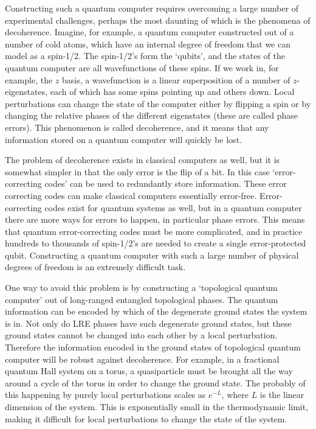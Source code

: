 Constructing such a quantum computer requires overcoming a large number of experimental challenges, perhaps the most daunting of which is the phenomena of decoherence. Imagine, for example, a quantum computer constructed out of a number of cold atoms, which have an internal degree of freedom that we can model as a spin-1/2. The spin-1/2's form the `qubits', and the states of the quantum computer are all wavefunctions of these spins. If we work in, for example, the $z$ basis, a wavefunction is a linear superposition of a number of $z$-eigenstates, each of which has some spins pointing up and others down. Local perturbations can change the state of the computer either by flipping a spin or by changing the relative phases of the different eigenstates (these are called phase errors). This phenomenon is called decoherence, and it means that any information stored on a quantum computer will quickly be lost.

The problem of decoherence exists in classical computers as well, but it is somewhat simpler in that the only error is the flip of a bit. In this case `error-correcting codes' can be used to redundantly store information. These error correcting codes can make classical computers essentially error-free. Error-correcting codes exist for quantum systems as well, but in a quantum computer there are more ways for errors to happen, in particular phase errors. This means that quantum error-correcting codes must be more complicated, and in practice hundreds to thousands of spin-1/2's are needed to create a single error-protected qubit. Constructing a quantum computer with such a large number of physical degrees of freedom is an extremely difficult task.

One way to avoid this problem is by constructing a `topological quantum computer' out of long-ranged entangled topological phases. The quantum information can be encoded by which of the degenerate ground states the system is in. Not only do LRE phases have such degenerate ground states, but these ground states cannot be changed into each other by a local perturbation. Therefore the information encoded in the ground states of topological quantum computer will be robust against decoherence. For example, in a fractional quantum Hall system on a torus, a quasiparticle must be brought all the way around a cycle of the torus in order to change the ground state. The probably of this happening by purely local perturbations scales as $e^{-L}$, where $L$ is the linear dimension of the system. This is exponentially small in the thermodynamic limit, making it difficult for local perturbations to change the state of the system.

